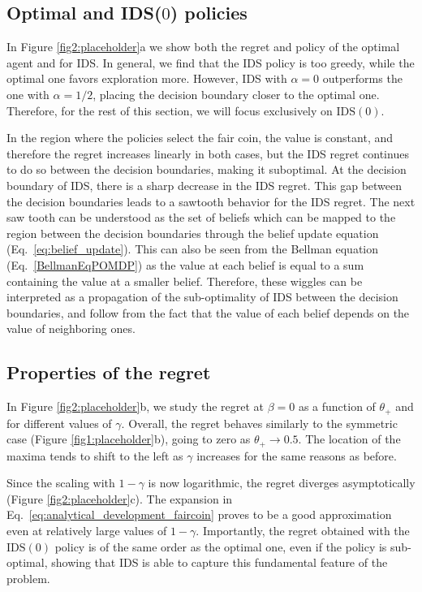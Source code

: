 \documentclass[aps,nofootinbib,groupaddress,superscriptaddress,reprint,amsmath,amssymb,graphicx,onecolumn,prx]{revtex4-2}
\begin{document}
\subsection{Optimal and IDS($0$) policies}
\noindent In Figure \ref{fig2:placeholder}a we show both the regret and policy of the optimal agent and for IDS. In general, we find that the IDS policy is too greedy, while the optimal one favors exploration more. However, IDS with $\alpha = 0$ outperforms the one with $\alpha = 1/2$, placing the decision boundary closer to the optimal one. Therefore, for the rest of this section, we will focus exclusively on $\mathrm{IDS}(0)$. 

In the region where the policies select the fair coin, the value is constant, and therefore the regret increases linearly in both cases, but the IDS regret continues to do so between the decision boundaries, making it suboptimal. At the decision boundary of IDS, there is a sharp decrease in the IDS regret. This gap between the decision boundaries leads to a sawtooth behavior for the IDS regret. The next saw tooth can be understood as the set of beliefs which can be mapped to the region between the decision boundaries through the belief update equation (Eq.~\eqref{eq:belief_update}). This can also be seen from the Bellman equation (Eq.~\eqref{BellmanEqPOMDP}) as the value at each belief is equal to a sum containing the value at a smaller belief. Therefore, these wiggles can be interpreted as a propagation of the sub-optimality of IDS between the decision boundaries, and follow from the fact that the value of each belief depends on the value of neighboring ones.

\subsection{Properties of the regret} 
\noindent In Figure \ref{fig2:placeholder}b, we study the regret at $\beta=0$ as a function of $\theta_+$ and for different values of $\gamma$. Overall, the regret behaves similarly to the symmetric case (Figure \ref{fig1:placeholder}b), going to zero as $\theta_+\to0.5$. The location of the maxima tends to shift to the left as $\gamma$ increases for the same reasons as before. 

Since the scaling with $1-\gamma$ is now logarithmic, the regret diverges asymptotically (Figure \ref{fig2:placeholder}c). The expansion in Eq.~\eqref{eq:analytical_development_faircoin} proves to be a good approximation even at relatively large values of $1-\gamma$. Importantly, the regret obtained with the $\mathrm{IDS}(0)$ policy is of the same order as the optimal one, even if the policy is sub-optimal, showing that IDS is able to capture this fundamental feature of the problem. %
 
\end{document}
